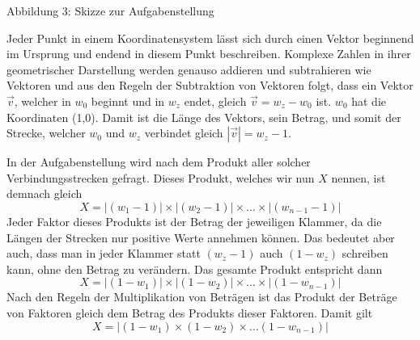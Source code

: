 \documentclass[a4paper,12pt]{article} %
\begin{document}
\begin{center}

\begin{small}
	Abbildung 3: Skizze zur Aufgabenstellung
\end{small}

\end{center}



Jeder Punkt in einem Koordinatensystem lässt sich durch einen Vektor beginnend im Ursprung und endend in diesem Punkt beschreiben. Komplexe Zahlen in ihrer geometrischer Darstellung werden genauso addieren und subtrahieren wie Vektoren und aus den Regeln der Subtraktion von Vektoren folgt, dass ein Vektor $\vec{v}$, welcher in $w_0$ beginnt und in $w_z$ endet, gleich $\vec{v}=w_z-w_0$ ist.
$w_0$ hat die Koordinaten (1,0).
Damit ist die Länge des Vektors, sein Betrag, und somit der Strecke, welcher $w_0$ und $w_z$ verbindet gleich $|\vec{v}| = w_z - 1$.

In der Aufgabenstellung wird nach dem Produkt aller solcher Verbindungsstrecken gefragt.
Dieses Produkt, welches wir nun $X$ nennen, ist demnach gleich
\[X = |(w_1-1)|\times|(w_2-1)|\times\dots\times|(w_{n-1}-1)|\]
Jeder Faktor dieses Produkts ist der Betrag der jeweiligen Klammer, da die Längen der Strecken nur positive Werte annehmen können.
Das bedeutet aber auch, dass man in jeder Klammer statt $(w_z-1)$ auch $(1-w_z)$ schreiben kann, ohne den Betrag zu verändern.
Das gesamte Produkt entspricht dann
\[X=|(1-w_1)|\times|(1-w_2)|\times\dots\times|(1-w_{n-1})|\]
Nach den Regeln der Multiplikation von Beträgen ist das Produkt der Beträge von Faktoren gleich dem Betrag des Produkts dieser Faktoren. Damit gilt
\begin{equation}\label{X}
	X=|(1-w_1)\times(1-w_2)\times\dots(1-w_{n-1})|
\end{equation}
\end{document}
